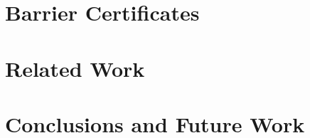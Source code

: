 \documentclass[12pt]{ucsddissertation}
\begin{document}
\chapter{Barrier Certificates}
\label{chap:exp-smpl}


\chapter{Related Work}
\label{chap:related}


\chapter{Conclusions and Future Work}
\label{chap:conclusion}



\backmatter

\end{document}
